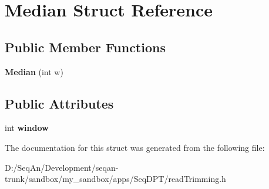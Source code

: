 \hypertarget{struct_median}{\section{Median Struct Reference}
\label{struct_median}
}
\subsection*{Public Member Functions}
\begin{DoxyCompactItemize}
\item 
\hypertarget{struct_median_aa9923cad36d6ba8d4e7d7648cbf36fc2}{{\bfseries Median} (int w)}\label{struct_median_aa9923cad36d6ba8d4e7d7648cbf36fc2}

\end{DoxyCompactItemize}
\subsection*{Public Attributes}
\begin{DoxyCompactItemize}
\item 
\hypertarget{struct_median_ac8e726d31a9c6a5dba46908fb23ed3aa}{int {\bfseries window}}\label{struct_median_ac8e726d31a9c6a5dba46908fb23ed3aa}

\end{DoxyCompactItemize}


The documentation for this struct was generated from the following file\-:\begin{DoxyCompactItemize}
\item 
D\-:/\-Seq\-An/\-Development/seqan-\/trunk/sandbox/my\-\_\-sandbox/apps/\-Seq\-D\-P\-T/read\-Trimming.\-h\end{DoxyCompactItemize}
